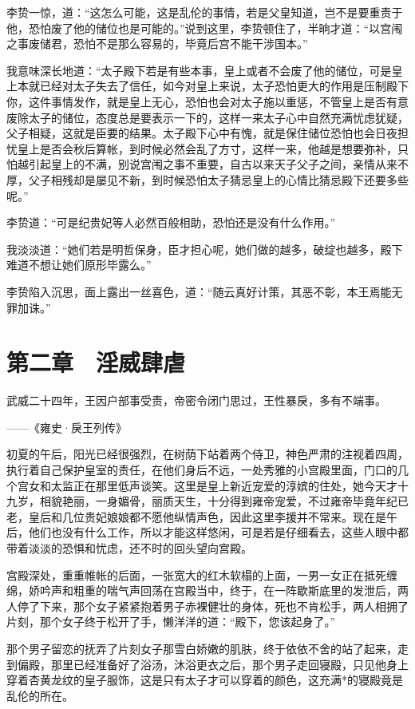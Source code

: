 李贽一惊，道：“这怎么可能，这是乱伦的事情，若是父皇知道，岂不是要重责于他，恐怕废了他的储位也是可能的。”说到这里，李贽顿住了，半晌才道：“以宫闱之事废储君，恐怕不是那么容易的，毕竟后宫不能干涉国本。”

我意味深长地道：“太子殿下若是有些本事，皇上或者不会废了他的储位，可是皇上本就已经对太子失去了信任，如今对皇上来说，太子恐怕更大的作用是压制殿下你，这件事情发作，就是皇上无心，恐怕也会对太子施以重惩，不管皇上是否有意废除太子的储位，态度总是要表示一下的，这样一来太子心中自然充满忧虑犹疑，父子相疑，这就是臣要的结果。太子殿下心中有愧，就是保住储位恐怕也会日夜担忧皇上是否会秋后算帐，到时候必然会乱了方寸，这样一来，他越是想要弥补，只怕越引起皇上的不满，别说宫闱之事不重要，自古以来天子父子之间，亲情从来不厚，父子相残却是屡见不新，到时候恐怕太子猜忌皇上的心情比猜忌殿下还要多些呢。”

李贽道：“可是纪贵妃等人必然百般相助，恐怕还是没有什么作用。”

我淡淡道：“她们若是明哲保身，臣才担心呢，她们做的越多，破绽也越多，殿下难道不想让她们原形毕露么。”

李贽陷入沉思，面上露出一丝喜色，道：“随云真好计策，其恶不彰，本王焉能无罪加诛。”

\chapter{第二章　淫威肆虐}

武威二十四年，王因户部事受责，帝密令闭门思过，王性暴戾，多有不端事。

——《雍史·戾王列传》

初夏的午后，阳光已经很强烈，在树荫下站着两个侍卫，神色严肃的注视着四周，执行着自己保护皇室的责任，在他们身后不远，一处秀雅的小宫殿里面，门口的几个宫女和太监正在那里低声谈笑。这里是皇上新近宠爱的淳嫔的住处，她今天才十九岁，相貌艳丽，一身媚骨，丽质天生，十分得到雍帝宠爱，不过雍帝毕竟年纪已老，皇后和几位贵妃娘娘都不愿他纵情声色，因此这里李援并不常来。现在是午后，他们也没有什么工作，所以才能这样悠闲，可是若是仔细看去，这些人眼中都带着淡淡的恐惧和忧虑，还不时的回头望向宫殿。

宫殿深处，重重帷帐的后面，一张宽大的红木软榻的上面，一男一女正在抵死缠绵，娇吟声和粗重的喘气声回荡在宫殿当中，终于，在一阵歇斯底里的发泄后，两人停了下来，那个女子紧紧抱着男子赤裸健壮的身体，死也不肯松手，两人相拥了片刻，那个女子终于松开了手，懒洋洋的道：“殿下，您该起身了。”

那个男子留恋的抚弄了片刻女子那雪白娇嫩的肌肤，终于依依不舍的站了起来，走到偏殿，那里已经准备好了浴汤，沐浴更衣之后，那个男子走回寝殿，只见他身上穿着杏黄龙纹的皇子服饰，这是只有太子才可以穿着的颜色，这充满*的寝殿竟是乱伦的所在。

